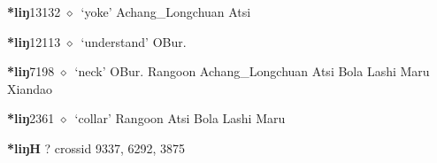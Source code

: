   \begin{list}{}{\leftmargin=1.5em \itemindent=-1.5em}
  \item {\footnotesize \textbf{*liŋ}}{\tiny 13132}
         $\diamond$~`yoke'
         Achang\_Longchuan 
\hspace{1ex}
         Atsi 
  \item {\footnotesize \textbf{*liŋ}}{\tiny 12113}
\hspace{1ex}
         $\diamond$~`understand'
         OBur. 
  \item {\footnotesize \textbf{*liŋ}}{\tiny 7198}
\hspace{1ex}
         $\diamond$~`neck'
         OBur. 
\hspace{1ex}
         Rangoon 
\hspace{1ex}
         Achang\_Longchuan 
\hspace{1ex}
         Atsi 
\hspace{1ex}
         Bola 
\hspace{1ex}
         Lashi 
\hspace{1ex}
         Maru 
\hspace{1ex}
         Xiandao 
  \item {\footnotesize \textbf{*liŋ}}{\tiny 2361}
\hspace{1ex}
         $\diamond$~`collar'
         Rangoon 
\hspace{1ex}
         Atsi 
\hspace{1ex}
         Bola 
\hspace{1ex}
         Lashi 
\hspace{1ex}
         Maru 
  \end{list}
\item
\textbf{*liŋH}
?
  {\tiny crossid 9337, 6292, 3875}
